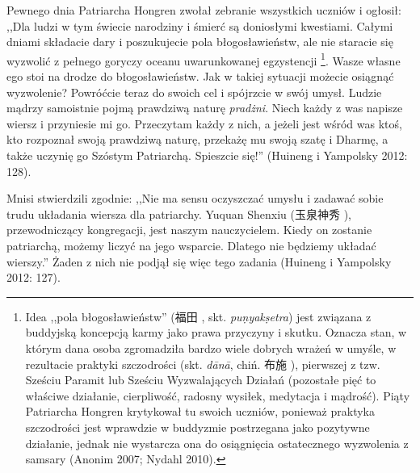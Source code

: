 Pewnego dnia Patriarcha Hongren zwołał zebranie wszystkich uczniów i ogłosił:
,,Dla ludzi w tym świecie narodziny i śmierć są doniosłymi kwestiami. Całymi dniami składacie dary i poszukujecie pola błogosławieństw, ale nie staracie się wyzwolić z pełnego goryczy oceanu uwarunkowanej egzystencji%
\footnote{Idea ,,pola błogosławieństw'' (福田 , skt. \textit{pu\d{n}yak\d{s}etra}) jest związana z buddyjską koncepcją karmy jako prawa przyczyny i skutku. Oznacza stan, w którym dana osoba zgromadziła bardzo wiele dobrych wrażeń w umyśle, w rezultacie praktyki szczodrości (skt. \textit{dānā}, chiń. 布施 ), pierwszej z tzw. Sześciu Paramit lub Sześciu Wyzwalających Działań (pozostałe pięć to właściwe działanie, cierpliwość, radosny wysiłek, medytacja i mądrość).\label{Paramitas}
Piąty Patriarcha Hongren krytykował tu swoich uczniów, ponieważ praktyka szczodrości jest wprawdzie w buddyzmie postrzegana jako pozytywne działanie, jednak nie wystarcza ona do osiągnięcia ostatecznego wyzwolenia z samsary (Anonim 2007; Nydahl 2010).}.
Wasze własne ego stoi na drodze do błogosławieństw. Jak w takiej sytuacji możecie osiągnąć wyzwolenie? Powróćcie teraz do swoich cel i spójrzcie w swój umysł. Ludzie mądrzy samoistnie pojmą prawdziwą naturę \textit{pradżni}\fnm. Niech każdy z was napisze wiersz i przyniesie mi go. Przeczytam każdy z nich, a jeżeli jest wśród was ktoś, kto rozpoznał swoją prawdziwą naturę, przekażę mu swoją szatę i Dharmę, a także uczynię go Szóstym Patriarchą. Spieszcie się!''
(Huineng i Yampolsky 2012: 128).

Mnisi stwierdzili zgodnie: ,,Nie ma sensu oczyszczać umysłu i zadawać sobie trudu układania wiersza dla patriarchy. Yuquan Shenxiu (玉泉神秀 ), przewodniczący kongregacji, jest naszym nauczycielem.
Kiedy on zostanie patriarchą, możemy liczyć na jego wsparcie. Dlatego nie będziemy układać wierszy.'' Żaden z nich nie podjął się więc tego zadania
(Huineng i Yampolsky 2012: 127).

